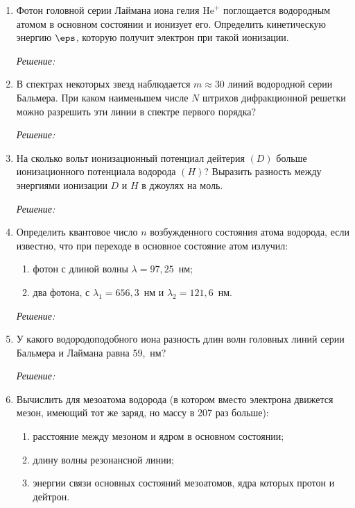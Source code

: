 \begin{enumerate}
\item Фотон головной серии Лаймана иона гелия \( \mathrm{He}^+ \) поглощается
водородным атомом в основном состоянии и ионизует его. Определить кинетическую
энергию \( \eps \), которую получит электрон при такой ионизации.

\emph{Решение:}

\newpage

\item В спектрах некоторых звезд наблюдается \( m \approx 30 \) линий водородной
серии Бальмера. При каком наименьшем числе \( N \) штрихов дифракционной решетки
можно разрешить эти линии в спектре первого порядка?

\emph{Решение:}

\newpage

\item На сколько вольт ионизационный потенциал дейтерия \( (D)\) больше
ионизационного потенциала водорода \( (H) \)? Выразить разность между энергиями
ионизации \( D \) и \( H \) в джоулях на моль.

\emph{Решение:}

\newpage

\item Определить квантовое число \( n \) возбужденного состояния атома водорода,
если известно, что при переходе в основное состояние атом излучил:
\begin{enumerate}
    \item фотон с длиной волны \( \lambda = 97,\!25 \)~нм;
    \item два фотона, с \(\lambda_1 = 656,\!3\)~нм и \(\lambda_2 = 121,\!6\)~нм.
\end{enumerate}

\emph{Решение:}

\newpage

\item У какого водородоподобного иона разность длин волн головных линий серии
Бальмера и Лаймана равна 59,~нм?

\emph{Решение:}

\newpage

\item Вычислить для мезоатома водорода (в котором вместо электрона движется
мезон, имеющий тот же заряд, но массу в 207 раз больше):
\begin{enumerate}
    \item расстояние между мезоном и ядром в основном состоянии;
    \item длину волны резонансной линии;
    \item энергии связи основных состояний мезоатомов, ядра которых протон и дейтрон.
\end{enumerate}


\end{enumerate}
